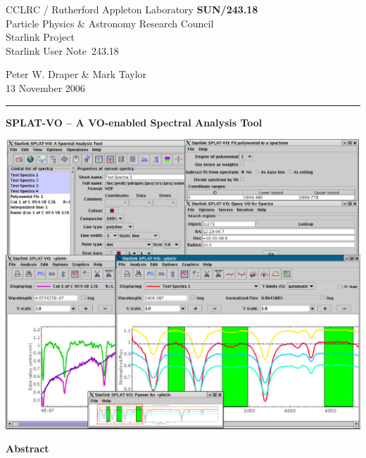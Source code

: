 \documentclass[twoside,11pt]{article}
\newcommand{\stardoccategory}  {Starlink User Note}
\newcommand{\stardocinitials}  {SUN}
\newcommand{\stardocnumber}    {243.18}
\newcommand{\stardocauthors}   {Peter W. Draper \& Mark Taylor}
\newcommand{\stardocdate}      {13 November 2006}
\newcommand{\stardoctitle}     {SPLAT-VO -- A VO-enabled Spectral Analysis Tool}
\newcommand{\stardocname}{\stardocinitials /\stardocnumber}
\newenvironment{latexonly}{}{}
\renewcommand{\_}{\texttt{\symbol{95}}}
\begin{document}
\thispagestyle{empty}

\begin{latexonly}
   CCLRC / Rutherford Appleton Laboratory \hfill \textbf{\stardocname}\\
   {\large Particle Physics \& Astronomy Research Council}\\
   {\large Starlink Project\\}
   {\large \stardoccategory\ \stardocnumber}
   \begin{flushright}
   \stardocauthors\\
   \stardocdate
   \end{flushright}
   \vspace{-4mm}
   \rule{\textwidth}{0.5mm}
   \vspace{5mm}
   \begin{center}
      {\LARGE\textbf{\stardoctitle \\ [2.5ex]}}
   \end{center}
   \vspace{5mm}

\begin{center}
\includegraphics[scale=0.4]{sun243_figures/frontfigure.eps}
\end{center}

   \begin{center}
      {\Large\textbf{Abstract}}
   \end{center}
\end{latexonly}
\end{document}
